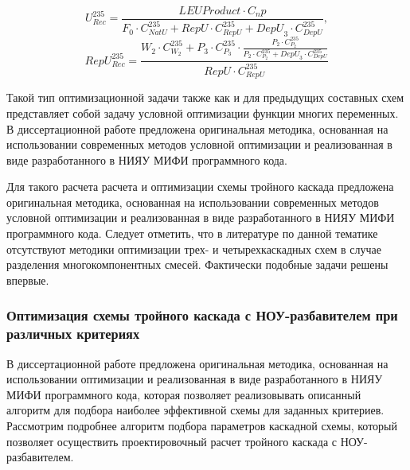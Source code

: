 \begin{equation} \label{Rec3} 
    U^{235}_{Rec} = \frac{LEU Product \cdot C_np}{F_0 \cdot C_{NatU}^{235} + RepU \cdot C_{RepU}^{235} + {DepU}_3 \cdot C_{DepU}^{235}}, 
\end{equation} 
\begin{equation} \label{RecR3} 
    RepU^{235}_{Rec} = \frac{W_2\cdot C_{W_2}^{235}+P_3\cdot C_{P_3}^{235}\cdot \frac{P_2\cdot C_{P_2}^{235}}{P_2\cdot C_{P_2}^{235}+ {DepU}_3 \cdot C_{DepU}^{235}}}{RepU \cdot C_{RepU}^{235}}        
\end{equation} 

Такой тип оптимизационной задачи также как и для предыдущих составных схем представляет собой задачу условной оптимизации функции многих переменных. В диссертационной работе предложена оригинальная методика, основанная на использовании современных методов условной оптимизации и реализованная в виде разработанного в НИЯУ МИФИ программного кода.

Для такого расчета расчета и оптимизации схемы тройного каскада предложена оригинальная методика, основанная на использовании современных методов условной оптимизации и реализованная в виде разработанного в НИЯУ МИФИ программного кода.
Следует отметить, что в литературе по данной тематике отсутствуют методики оптимизации трех- и четырехкаскадных схем в случае разделения многокомпонентных смесей. Фактически подобные задачи решены впервые.



\subsubsection{Оптимизация схемы тройного каскада с НОУ-разбавителем при различных критериях}

В диссертационной работе предложена оригинальная методика, основанная на использовании оптимизации и реализованная в виде разработанного в НИЯУ МИФИ программного кода, которая позволяет реализовывать описанный алгоритм для подбора наиболее эффективной схемы для заданных критериев.
Рассмотрим подробнее алгоритм подбора параметров каскадной схемы, который позволяет осуществить проектировочный расчет тройного каскада с НОУ-разбавителем.

